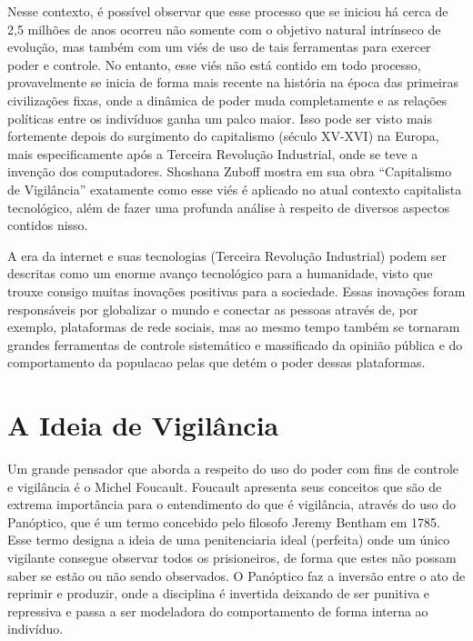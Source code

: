 \documentclass[
	12pt,
	openright,
	twoside,
	a4paper,
	english,
	french,
	spanish,
	brazil
]{abntex2}
\begin{document}
  Nesse contexto, é possível observar que esse processo que se iniciou há cerca
  de 2,5 milhões de anos ocorreu não somente com o objetivo natural intrínseco
  de evolução, mas também com um viés de uso de tais ferramentas para exercer
  poder e controle. No entanto, esse viés não está contido em todo processo,
  provavelmente se inicia de forma mais recente na história na época das
  primeiras civilizações fixas, onde a dinâmica de poder muda completamente e as
  relações políticas entre os indivíduos ganha um palco maior. Isso pode ser
  visto mais fortemente depois do surgimento do capitalismo (século XV-XVI) na
  Europa, mais especificamente após a Terceira Revolução Industrial, onde se
  teve a invenção dos computadores. Shoshana Zuboff mostra em sua obra
  ``Capitalismo de Vigilância'' exatamente como esse viés é aplicado no atual
  contexto capitalista tecnológico, além de fazer uma profunda análise à
  respeito de diversos aspectos contidos nisso.

  A era da internet e suas tecnologias (Terceira Revolução Industrial) podem ser
  descritas como um enorme avanço tecnológico para a humanidade, visto que
  trouxe consigo muitas inovações positivas para a sociedade. Essas inovações
  foram responsáveis por globalizar o mundo e conectar as pessoas através de,
  por exemplo, plataformas de rede sociais, mas ao mesmo tempo também se
  tornaram grandes ferramentas de controle sistemático e massificado da opinião
  pública e do comportamento da populacao pelas que detém o poder dessas
  plataformas.

  \chapter{A Ideia de Vigilância}

  Um grande pensador que aborda a respeito do uso do poder com fins de controle
  e vigilância é o Michel Foucault. Foucault apresenta seus conceitos que são de
  extrema importância para o entendimento do que é vigilância, através do uso do
  Panóptico, que é um termo concebido pelo filosofo Jeremy Bentham em 1785. Esse
  termo designa a ideia de uma penitenciaria ideal (perfeita) onde um único
  vigilante consegue observar todos os prisioneiros, de forma que estes não
  possam saber se estão ou não sendo observados. O Panóptico faz a inversão
  entre o ato de reprimir e produzir, onde a disciplina é invertida deixando de
  ser punitiva e repressiva e passa a ser modeladora do comportamento de forma
  interna ao indivíduo.


  \postextual

  
\end{document}
